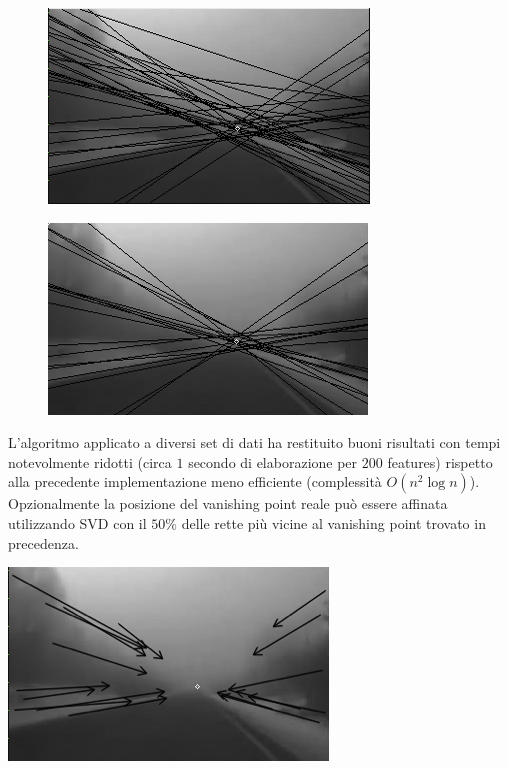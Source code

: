 \documentclass[12pt]{report}
\begin{document}
\begin{figure}
	\begin{minipage}[b]{0.5\linewidth}
		\centering
		\includegraphics[scale=0.6]{images/iaasBefore.png}
		\label{fig:vpBef}
	\end{minipage}
	\hspace{0.5cm}
	\begin{minipage}[b]{0.5\linewidth}
		\centering
		\includegraphics[scale=0.6]{images/iaasAfter.png}
		\label{fig:vpAft}
	\end{minipage}
\end{figure}

\noindent L'algoritmo applicato a diversi set di dati ha restituito buoni risultati con tempi notevolmente ridotti (circa $1$ secondo di elaborazione per $200$ features) rispetto alla precedente implementazione meno efficiente (complessit\`a $O\left(n^2\log{n}\right)$).\\

\noindent Opzionalmente la posizione del vanishing point reale pu\`o essere affinata utilizzando SVD con il $50\%$ delle rette pi\`u vicine al vanishing point trovato in precedenza.\\

\begin{center}
	\includegraphics[scale=0.7]{images/iaasAfterArrow.png}
	\label{fig:vpAftArr}
\end{center}
\end{document}
